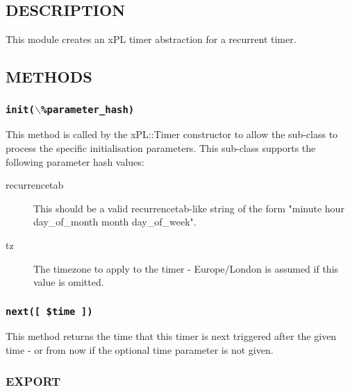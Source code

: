 \subsection*{DESCRIPTION\label{xPL::Timer::recurrence_DESCRIPTION}}


This module creates an xPL timer abstraction for a recurrent timer.

\subsection*{METHODS\label{xPL::Timer::recurrence_METHODS}}
\subsubsection*{\texttt{init($\backslash$\%parameter\_hash)}\label{xPL::Timer::recurrence_init_backslash_parameter_hash_}}


This method is called by the xPL::Timer constructor to allow the
sub-class to process the specific initialisation parameters.  This
sub-class supports the following parameter hash values:

\begin{description}

\item[{recurrencetab}] \mbox{}

This should be a valid recurrencetab-like string of the form
"minute hour day\_of\_month month day\_of\_week".


\item[{tz}] \mbox{}

The timezone to apply to the timer - Europe/London is assumed if this
value is omitted.

\end{description}
\subsubsection*{\texttt{next([ \$time ])}\label{xPL::Timer::recurrence_next_time_}}


This method returns the time that this timer is next triggered after
the given time - or from now if the optional time parameter is not
given.

\subsubsection*{EXPORT\label{xPL::Timer::recurrence_EXPORT}}


